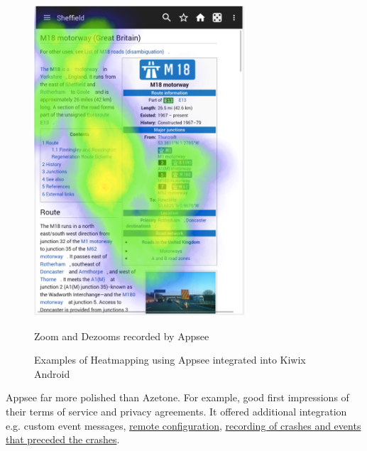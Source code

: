 \begin{figure}
\begin{minipage}[b]{0.4\textwidth}
      \end{minipage}
      \hfill
      \begin{minipage}[b]{0.4\textwidth}
        \includegraphics[width=\textwidth]{images/my/kiwix-appsee-zoom-dezoom.png}
        \caption{Zoom and Dezooms recorded by Appsee}
      \end{minipage}
    \caption*{Examples of Heatmapping using Appsee integrated into Kiwix Android}
    \label{fig:heatmapping-examples-kiwix-appsee}
\end{figure}

Appsee far more polished than Azetone. For example, good first impressions of their terms of service and privacy agreements. It offered additional integration e.g. custom event messages, \href{https://web.archive.org/web/20150416132023/https://www.appsee.com/features/remote-configuration}{remote configuration}, \href{https://web.archive.org/web/20150317060748/https://www.appsee.com/features/crash-recordings}{recording of crashes and events that preceded the crashes}.

